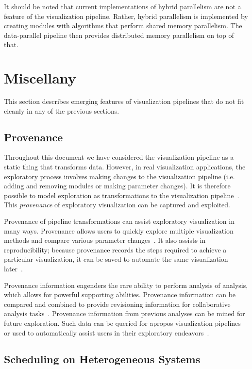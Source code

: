 \documentclass[journal,onecolumn,12pt,letterpaper,twoside]{IEEEtran}
\newcommand*{\lcite}[1]{~\cite{#1}}
\newcommand*{\keyterm}[1]{\emph{#1}}
\begin{document}
It should be noted that current implementations of hybrid parallelism are
not a feature of the visualization pipeline.  Rather, hybrid parallelism is
implemented by creating modules with algorithms that perform shared
memory parallelism.  The data-parallel pipeline then provides distributed
memory parallelism on top of that.

\section{Miscellany}
\label{sec:Misc}

This section describes emerging features of visualization pipelines that do
not fit cleanly in any of the previous sections.

\subsection{Provenance}
\label{sec:Provenance}

Throughout this document we have considered the visualization pipeline as a
static thing that transforms data.  However, in real visualization
applications, the exploratory process involves making changes to the
visualization pipeline (i.e. adding and removing modules or making
parameter changes).  It is therefore possible to model exploration as
transformations to the visualization pipeline\lcite{JankunKelly2002}.  This
\keyterm{provenance} of exploratory visualization can be captured and
exploited.

Provenance of pipeline transformations can assist exploratory visualization
in many ways.  Provenance allows users to quickly explore multiple
visualization methods and compare various parameter
changes\lcite{VisTrails}.  It also assists in reproducibility; because
provenance records the steps required to achieve a particular
visualization, it can be saved to automate the same visualization
later\lcite{Silva2007}.

Provenance information engenders the rare ability to perform analysis of
analysis, which allows for powerful supporting abilities.  Provenance
information can be compared and combined to provide revisioning information
for collaborative analysis tasks\lcite{Ellkvist2008}.  Provenance
information from previous analyses can be mined for future exploration.
Such data can be queried for apropos visualization
pipelines\lcite{Scheidegger2007} or used to automatically assist users in
their exploratory endeavors\lcite{Koop2008}.

\subsection{Scheduling on Heterogeneous Systems}
\label{sec:SchedulingHeterogeneous}
\end{document}
